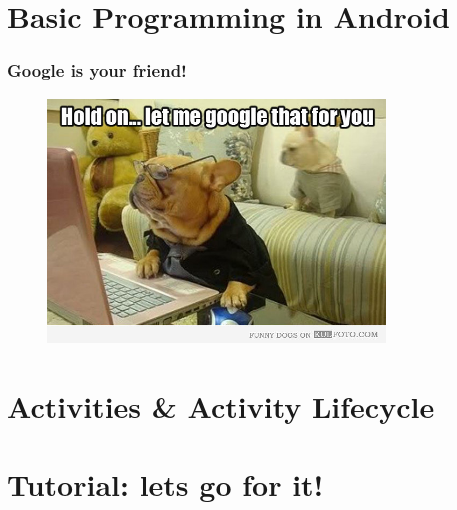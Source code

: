 \documentclass{beamer}
\begin{document}
\section{Basic Programming in Android}
\sectionframe

\begin{frame}
\frametitle{Google is your friend!}
\begin{figure}
	\centering
		\includegraphics[width=0.8\textwidth]{img/google.jpg}
	\label{fig:google}
\end{figure}
\end{frame}



\section{Activities \& Activity Lifecycle}
\sectionframe

\section{Tutorial: lets go for it!}
\sectionframe



\end{document}
